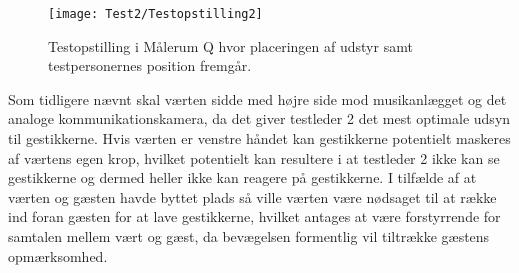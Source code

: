 %
\begin{figure}[H]
	\centering
	\texttt{[image: Test2/Testopstilling2]}
	\caption{Testopstilling i Målerum Q hvor placeringen af udstyr samt testpersonernes position fremgår.}
	\label{fig:Testopstilling2}
\end{figure}
\noindent
% 
Som tidligere nævnt skal værten sidde med højre side mod musikanlægget og det analoge kommunikationskamera, da det giver testleder 2 det mest optimale udsyn til gestikkerne. Hvis værten er venstre håndet kan gestikkerne potentielt maskeres af værtens egen krop, hvilket potentielt kan resultere i at testleder 2 ikke kan se gestikkerne og dermed heller ikke kan reagere på gestikkerne. I tilfælde af at værten og gæsten havde byttet plads så ville værten være nødsaget til at række ind foran gæsten for at lave gestikkerne, hvilket antages at være forstyrrende for samtalen mellem vært og gæst, da bevægelsen formentlig vil tiltrække gæstens opmærksomhed. 

